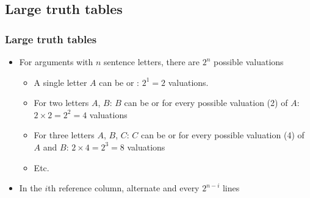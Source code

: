 \newhourlecture



\subsection{Large truth tables}


\begin{frame}
\frametitle{Large truth tables}

\begin{itemize}[<+->]
\item For arguments with $n$ sentence letters, there are $2^n$
possible valuations
\begin{itemize}[<+->]
\item A single letter $A$ can be \True{} or \False{}: $2^1 = 2$ valuations.
\item For two letters $A$, $B$: $B$ can be \True{} or \False{} for every
possible valuation (2) of $A$: $2 \times 2 = 2^2 = 4$ valuations
\item For three letters $A$, $B$, $C$: $C$ can be \True{} or \False{}
for every possible valuation (4) of $A$ and $B$: $2 \times 4 = 2^3 =
8$ valuations
\item Etc.
\end{itemize}
\item In the $i$th reference column, alternate \True{} and \False{}
every $2^{n-i}$ lines
\end{itemize}
\end{frame}


